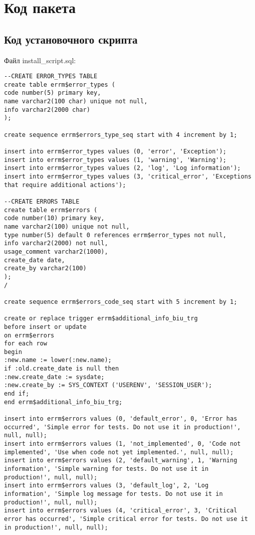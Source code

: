 \chapter{Код пакета}\label{appendix-1}							%
\section{Код установочного скрипта}\label{app-1}
Файл install\_script.sql:

\begin{verbatim}
--CREATE ERROR_TYPES TABLE
create table errm$error_types (
code number(5) primary key,
name varchar2(100 char) unique not null,
info varchar2(2000 char)
);

create sequence errm$errors_type_seq start with 4 increment by 1;

insert into errm$error_types values (0, 'error', 'Exception');
insert into errm$error_types values (1, 'warning', 'Warning');
insert into errm$error_types values (2, 'log', 'Log information');
insert into errm$error_types values (3, 'critical_error', 'Exceptions that require additional actions');

--CREATE ERRORS TABLE
create table errm$errors (
code number(10) primary key,
name varchar2(100) unique not null,
type number(5) default 0 references errm$error_types not null,
info varchar2(2000) not null,
usage_comment varchar2(1000),
create_date date,
create_by varchar2(100)
);
/

create sequence errm$errors_code_seq start with 5 increment by 1;

create or replace trigger errm$additional_info_biu_trg
before insert or update
on errm$errors
for each row
begin
:new.name := lower(:new.name);
if :old.create_date is null then
:new.create_date := sysdate;
:new.create_by := SYS_CONTEXT ('USERENV', 'SESSION_USER');
end if;
end errm$additional_info_biu_trg;

insert into errm$errors values (0, 'default_error', 0, 'Error has occurred', 'Simple error for tests. Do not use it in production!', null, null);
insert into errm$errors values (1, 'not_implemented', 0, 'Code not implemented', 'Use when code not yet implemented.', null, null);
insert into errm$errors values (2, 'default_warning', 1, 'Warning information', 'Simple warning for tests. Do not use it in production!', null, null);
insert into errm$errors values (3, 'default_log', 2, 'Log information', 'Simple log message for tests. Do not use it in production!', null, null);
insert into errm$errors values (4, 'critical_error', 3, 'Critical error has occurred', 'Simple critical error for tests. Do not use it in production!', null, null);


\end{verbatim}
